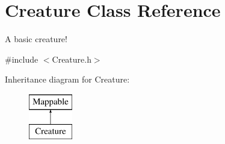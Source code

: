\hypertarget{classCreature}{\section{\-Creature \-Class \-Reference}
\label{classCreature}
}


\-A basic creature!  




{\ttfamily \#include $<$\-Creature.\-h$>$}

\-Inheritance diagram for \-Creature\-:\begin{figure}[H]
\begin{center}
\leavevmode
\includegraphics[height=2.000000cm]{classCreature}
\end{center}
\end{figure}
